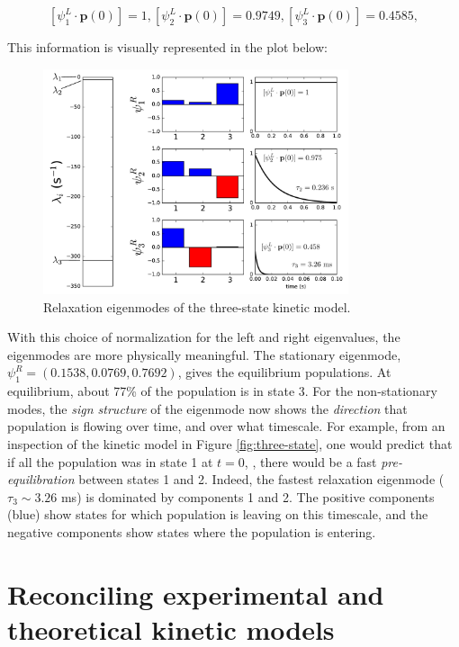 \documentclass[11pt, oneside]{article}   	%
\begin{document}
\[
[\psi^L_1 \cdot  \mathbf{p}(0)] = 1, 
[\psi^L_2 \cdot  \mathbf{p}(0)] = 0.9749, 
[\psi^L_3 \cdot  \mathbf{p}(0)] = 0.4585, 
\]

This information is visually represented in the plot below:

\begin{figure}[htbp]
\begin{center}
\includegraphics[width=0.8\textwidth]{relaxation-eigenmodes}
\caption{\label{fig:relaxation-eigenmodes}Relaxation eigenmodes of the three-state kinetic model.}
\end{center}
\end{figure}

With this choice of normalization for the left and right eigenvalues, the eigenmodes are more physically meaningful.  The stationary eigenmode, $\psi_1^R  = (0.1538, 0.0769, 0.7692)$, gives the equilibrium populations.  At equilibrium, about 77\% of the population is in state 3.   For the non-stationary modes, the \textit{sign structure} of the eigenmode now shows the \textit{direction} that population is flowing over time, and over what timescale.  For example, from an inspection of the kinetic model in Figure \ref{fig:three-state}, one would predict that if all the population was in state 1 at $t=0$, , there would be a fast \textit{pre-equilibration} between states 1 and 2.  Indeed, the fastest relaxation eigenmode ($\tau_3 \sim 3.26$ ms) is dominated by components 1 and 2. The positive components (blue) show states for which population is leaving on this timescale, and the negative components show states where the population is entering.

\section*{Reconciling experimental and theoretical kinetic models}
\end{document}
